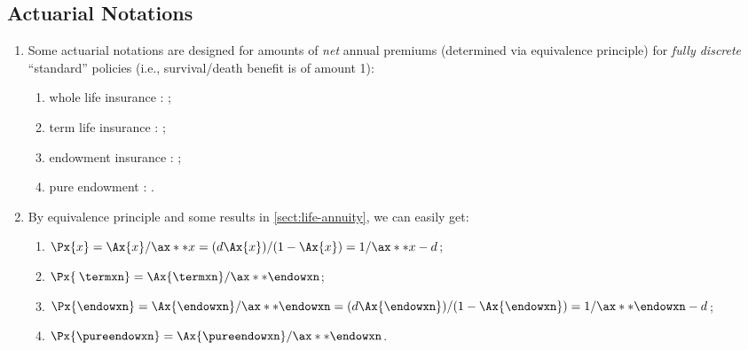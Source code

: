 \subsection{Actuarial Notations}
\begin{enumerate}
\item \label{it:net-annual-prem-notations}
Some actuarial notations are designed for amounts of \emph{net} annual premiums
(determined via equivalence principle) for \emph{fully discrete} ``standard''
policies (i.e., survival/death benefit is of amount 1):
 \begin{enumerate}
\item whole life insurance \textbar{}:
;
\item term life insurance \textbar{}: ;
\item endowment insurance \textbar{}\textbar{}: ;
\item pure endowment : .
\end{enumerate}

\item \label{it:net-prem-fmlas}
By equivalence principle and some results in \cref{sect:life-annuity}, we can
easily get:
\begin{enumerate}
\item \(\Px{x}=\Ax{x}/\ax**{x}=(d\Ax{x})/(1-\Ax{x})=1/\ax**{x}-d\);
\item \(\Px{\:\termxn}=\Ax{\termxn}/\ax**{\endowxn}\);
\item \(\Px{\endowxn}=\Ax{\endowxn}/\ax**{\endowxn}=(d\Ax{\endowxn})/(1-\Ax{\endowxn})=1/\ax**{\endowxn}-d\);
\item \(\Px{\pureendowxn}=\Ax{\pureendowxn}/\ax**{\endowxn}\).
\end{enumerate}



\end{enumerate}
